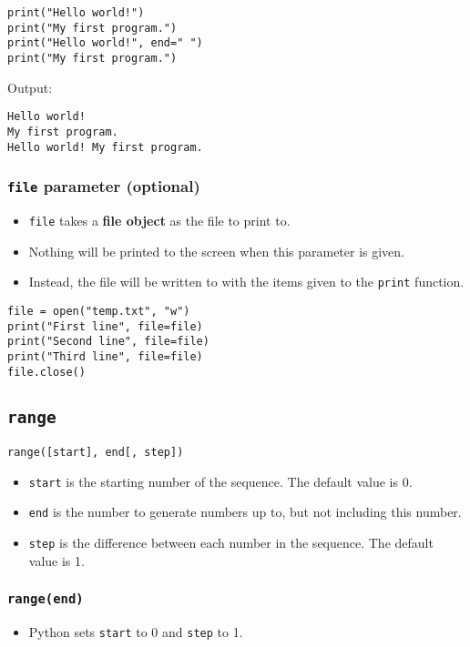 \documentclass[11pt]{article}
\begin{document}
\begin{verbatim}
print("Hello world!")
print("My first program.")
print("Hello world!", end=" ")
print("My first program.")
\end{verbatim}

 \noindent Output:

\label{orgac44681}
\begin{verbatim}
Hello world!
My first program.
Hello world! My first program.
\end{verbatim}
\subsubsection{\texttt{file} parameter (optional)}
\label{sec:org0f54250}
\begin{itemize}
\item \texttt{file} takes a \textbf{file object} as the file to print to.
\item Nothing will be printed to the screen when this parameter is given.
\item Instead, the file will be written to with the items given to the \texttt{print} function.
\end{itemize}
\begin{verbatim}
file = open("temp.txt", "w")
print("First line", file=file)
print("Second line", file=file)
print("Third line", file=file)
file.close()
\end{verbatim}
\subsection{\texttt{range}}
\label{sec:org92c2290}
\texttt{range([start], end[, step])}
\begin{itemize}
\item \texttt{start} is the starting number of the sequence. The default value is 0.
\item \texttt{end} is the number to generate numbers up to, but not including this number.
\item \texttt{step} is the difference between each number in the sequence. The default value is 1.
\end{itemize}
\subsubsection{\texttt{range(end)}}
\label{sec:orgf3cdec3}
\begin{itemize}
\item Python sets \texttt{start} to 0 and \texttt{step} to 1.
\end{itemize}
\end{document}

